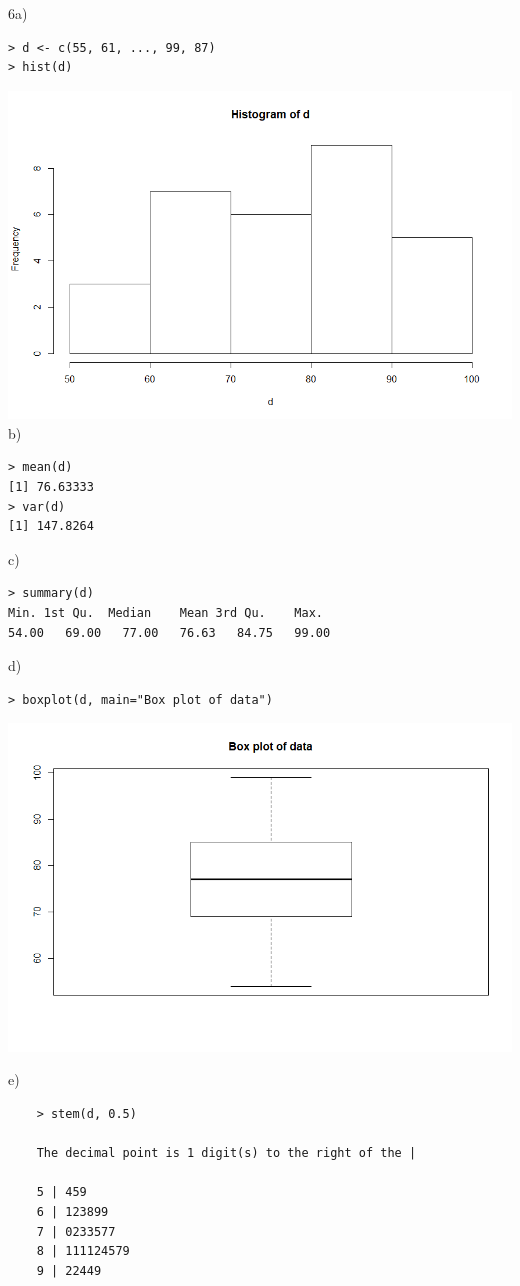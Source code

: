 \documentclass[12pt]{report}
\begin{document}
\clearpage

\noindent 6a)

\begin{verbatim}
> d <- c(55, 61, ..., 99, 87)
> hist(d)
\end{verbatim}

\includegraphics[scale=0.6]{6hist}
\noindent b)
\begin{verbatim}
> mean(d)
[1] 76.63333
> var(d)
[1] 147.8264
\end{verbatim}
\noindent c)
\begin{verbatim}
> summary(d)
Min. 1st Qu.  Median    Mean 3rd Qu.    Max. 
54.00   69.00   77.00   76.63   84.75   99.00
\end{verbatim}

\clearpage

\noindent d)
\begin{verbatim}
> boxplot(d, main="Box plot of data")
\end{verbatim}

\includegraphics[scale=0.625]{6box}

\noindent e)
\begin{verbatim}
	> stem(d, 0.5)
	
	The decimal point is 1 digit(s) to the right of the |
	
	5 | 459
	6 | 123899
	7 | 0233577
	8 | 111124579
	9 | 22449
\end{verbatim}
\end{document}
